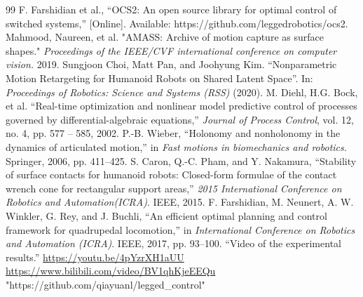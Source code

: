 \documentclass[a4paper, 10pt, conference]{ieeeconf}      %
\begin{document}
\begin{thebibliography}{99}
 F. Farshidian et al., “OCS2: An open source library for optimal control of switched systems,” [Online]. Available: https://github.com/leggedrobotics/ocs2.
 Mahmood, Naureen, et al. "AMASS: Archive of motion capture as surface shapes." \textit{Proceedings of the IEEE/CVF international conference on computer vision.} 2019.
 Sungjoon Choi, Matt Pan, and Joohyung Kim. “Nonparametric Motion Retargeting for Humanoid Robots on Shared Latent Space”. In: \textit{Proceedings of Robotics: Science and Systems (RSS)} (2020).
 M. Diehl, H.G. Bock, et al. “Real-time optimization and nonlinear model predictive control of processes governed by differential-algebraic equations,” \textit{Journal of Process Control}, vol. 12, no. 4, pp. 577 – 585, 2002.
 P.-B. Wieber, “Holonomy and nonholonomy in the dynamics of articulated motion,” in \textit{Fast motions in biomechanics and robotics.} Springer, 2006, pp. 411–425.
 S. Caron, Q.-C. Pham, and Y. Nakamura, “Stability of surface contacts for humanoid robots: Closed-form formulae of the contact wrench cone for rectangular support areas,” \textit{2015 International Conference on Robotics and Automation(ICRA)}. IEEE, 2015.
 F. Farshidian, M. Neunert, A. W. Winkler, G. Rey, and J. Buchli, “An efficient optimal planning and control framework for quadrupedal locomotion,” in \textit{International Conference on Robotics and Automation (ICRA)}. IEEE, 2017, pp. 93–100.
 “Video of the experimental results.” \href{https://youtu.be/4pYzrXH1aUU}{https://youtu.be/4pYzrXH1aUU} \href{https://www.bilibili.com/video/BV1qhKjeEEQu}{https://www.bilibili.com/video/BV1qhKjeEEQu}  
 "https://github.com/qiayuanl/legged\_control"
\end{thebibliography}
\enlargethispage{\baselineskip}
\end{document}
